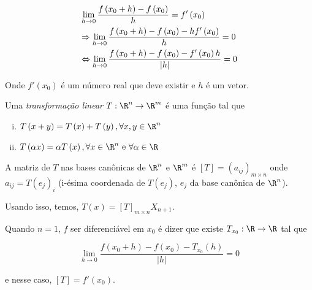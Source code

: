 \documentclass[11pt, oneside, a4paper]{gsm-l}
\begin{document}
\[
\begin{gathered}
  \mathop {\lim }\limits_{h \to 0} \frac{{f\left( {x_0  + h} \right) - f\left( {x_0 } \right)}}
{h} = f'\left( {x_0 } \right) \hfill \\
   \Rightarrow \mathop {\lim }\limits_{h \to 0} \frac{{f\left( {x_0  + h} \right) - f\left( {x_0 } \right) - hf'\left( {x_0 } \right)}}
{h} = 0 \hfill \\
   \Leftrightarrow \mathop {\lim }\limits_{h \to 0} \frac{{f\left( {x_0  + h} \right) - f\left( {x_0 } \right) - f'\left( {x_0 } \right)h}}
{{\left| h \right|}} = 0 \hfill \\
\end{gathered}
\]

Onde $f'\left( {x_0 } \right)$ é um n\'umero real que deve existir e $h$ é um vetor.

\begin{defi}
\begin{sloppypar}
Uma \textit{transformação linear} ${T:\R^n  \to \R^m}$ é uma função tal que
\end{sloppypar}


\begin{enumerate}[i)]
      \item $T\left( {x + y} \right) = T\left( x \right) + T\left( y \right),\forall x,y \in \R^n$
      \item $T\left( {\alpha x} \right) = \alpha T\left( x \right),\forall x \in \R^n {\text{ e }}\forall \alpha  \in \R$
\end{enumerate}
\end{defi}

\begin{defi}
    A matriz de $T$ nas bases can\^onicas de $\R^n$ e $\R^m$ é $\left[ T \right] = \left( {a_{ij} } \right)_{m \times n}$ onde $a_{ij}  = T\left( {e_j } \right)_i$ (i-ésima coordenada de $T\left( {e_j } \right)$, $e_j$ da base can\^onica de $\R^n$).

    Usando isso, temos, $T\left( x \right) = \left[ T \right]_{m \times n} X_{n + 1}$.

    Quando $n=1$, $f$ ser diferenciável em $x_0$ é dizer que existe $T_{x_0 } :\R \to \R$ tal que

\[
    \mathop {\lim }\limits_{h \to 0} \frac{{f\left( {x_0  + h} \right) - f\left( {x_0 } \right) - T_{x_0 } \left( h \right)}}{{\left| h \right|}} = 0
\]

e nesse caso, $\left[ T \right] = f'\left( {x_0 } \right)$.
\end{defi}
\end{document}
